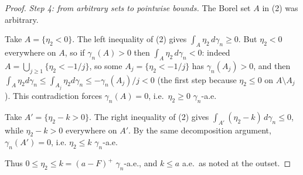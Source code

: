 \begin{proof}
\emph{Step 4: from arbitrary sets to pointwise bounds.}
The Borel set $A$ in (2) was arbitrary.

Take $A = \{\eta_2 < 0\}$.  The left inequality of (2) gives
$\int_A \eta_2 \, d\gamma_n \geq 0$.  But $\eta_2 < 0$ everywhere on $A$, so if
$\gamma_n(A) > 0$ then $\int_A \eta_2\,d\gamma_n < 0$: indeed
$A = \bigcup_{j\geq1}\{\eta_2 < -1/j\}$, so some $A_j = \{\eta_2 < -1/j\}$ has
$\gamma_n(A_j) > 0$, and then
$\int_A \eta_2 d\gamma_n \leq \int_{A_j}\eta_2 d\gamma_n \leq -\gamma_n(A_j)/j < 0$
(the first step because $\eta_2 \leq 0$ on $A \setminus A_j$).  This contradiction
forces $\gamma_n(A) = 0$, i.e.\ $\eta_2 \geq 0$ $\gamma_n$-a.e.

Take $A' = \{\eta_2 - k > 0\}$.  The right inequality of (2) gives
$\int_{A'} (\eta_2 - k)\, d\gamma_n \leq 0$, while $\eta_2 - k > 0$ everywhere on
$A'$.  By the same decomposition argument, $\gamma_n(A') = 0$, i.e.
$\eta_2 \leq k$ $\gamma_n$-a.e.

Thus $0 \leq \eta_2 \leq k = (a-F)^+$ $\gamma_n$-a.e., and
$k \leq a$ a.e.\ as noted at the outset.
\end{proof}
